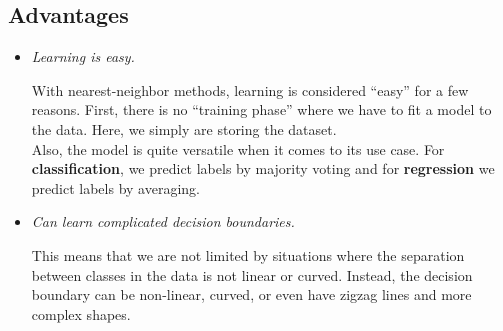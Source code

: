 \documentclass{report}
\begin{document}
\subsection{Advantages}
  \begin{itemize}
    \item \emph{Learning is easy.}
    
    With nearest-neighbor methods, learning is considered ``easy'' for a few
    reasons. First, there is no ``training phase'' where we have to fit a model
    to the data. Here, we simply are storing the dataset.
    \\[12pt]
    Also, the model is quite versatile when it comes to its use case. For
    \textbf{classification}, we predict labels by majority voting and for
    \textbf{regression} we predict labels by averaging.

    \item \emph{Can learn complicated decision boundaries.}
    
    This means that we are not limited by situations where the separation
    between classes in the data is not linear or curved. Instead, the
    decision boundary can be non-linear, curved, or even have zigzag lines and
    more complex shapes.
  \end{itemize}
\end{document}
